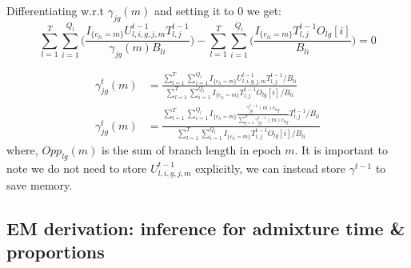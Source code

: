 Differentiating w.r.t $\gamma_{jg}(m)$ and setting it to 0 we get:
\begin{equation}
\sum_{l = 1}^T \sum_{i = 1}^{Q_l}  \Big( \frac{I_{\{e_{l i} = m\}}U_{l,i,g,j,m}^{t-1} T_{l,j}^{t-1}}{\gamma_{jg}(m)B_{li}} \Big) -  \sum_{l = 1}^T \sum_{i = 1}^{Q_l} \Big(\frac{I_{\{e_{l i} = m\}} T_{l,j}^{t-1}  O_{lg}[i]}{B_{li}} \Big) = 0
\end{equation} 

\begin{align}
    \gamma_{jg}^{t}(m) &= \frac{\sum_{l = 1}^T \sum_{i = 1}^{Q_l}  I_{\{e_{l i} = m\}} U_{l,i,g,j,m}^{t-1} T_{l,j}^{t-1}/B_{li}}{\sum_{l = 1}^T \sum_{i = 1}^{Q_l}  I_{\{e_{l i} = m\}} T_{l,j}^{t-1}  O_{lg}[i]/B_{li} } \nonumber \\
    \gamma_{jg}^{t}(m) &= \frac{\sum_{l = 1}^T \sum_{i = 1}^{Q_l}  I_{\{e_{l i} = m\}} \frac{\gamma_{jg}^{t-1}(m)c_{lig}}{\sum_{g=1}^R \gamma_{jg}^{t-1}(m)c_{lig}} T_{l,j}^{t-1}/B_{li}}{\sum_{l = 1}^T \sum_{i = 1}^{Q_l}  I_{\{e_{l i} = m\}} T_{l,j}^{t-1}  O_{lg}[i]/B_{li} }
\label{eq:gamma_update}
\end{align}
where, $Opp_{lg}(m)$ is the sum of branch length in epoch $m$. It is important to note we do not need to store $U_{l,i,g,j,m}^{t-1}$ explicitly, we can instead store $\gamma^{t-1}$ to save memory.

\subsection{EM derivation: inference for admixture time \& proportions}

